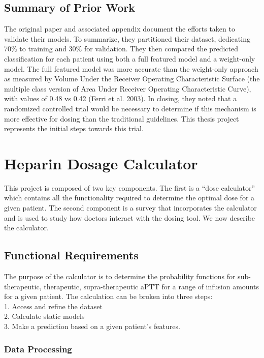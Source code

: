 \documentclass[12pt,a4paper,]{report}
\begin{document}
\section{Summary of Prior Work}\label{summary-of-prior-work}

The original paper and associated appendix document the efforts taken to
validate their models. To summarize, they partitioned their dataset,
dedicating 70\% to training and 30\% for validation. They then compared
the predicted classification for each patient using both a full featured
model and a weight-only model. The full featured model was more accurate
than the weight-only approach as measured by Volume Under the Receiver
Operating Characteristic Surface (the multiple class version of Area
Under Receiver Operating Characteristic Curve), with values of 0.48 vs
0.42 (Ferri et al. 2003). In closing, they noted that a randomized
controlled trial would be necessary to determine if this mechanism is
more effective for dosing than the traditional guidelines. This thesis
project represents the initial steps towards this trial.

\chapter{Heparin Dosage Calculator}\label{heparin-dosage-calculator}

This project is composed of two key components. The first is a ``dose
calculator'' which contains all the functionality required to determine
the optimal dose for a given patient. The second component is a survey
that incorporates the calculator and is used to study how doctors
interact with the dosing tool. We now describe the calculator.

\section{Functional Requirements}\label{functional-requirements}

The purpose of the calculator is to determine the probability functions
for sub-therapeutic, therapeutic, supra-therapeutic aPTT for a range of
infusion amounts for a given patient. The calculation can be broken into
three steps:\\
1. Access and refine the dataset\\
2. Calculate static models\\
3. Make a prediction based on a given patient's features.

\subsection{Data Processing}\label{data-processing}
\end{document}
